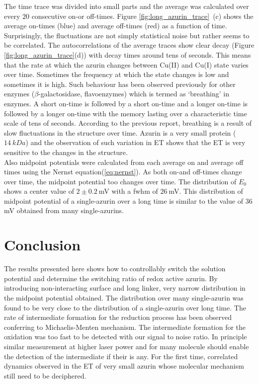 \documentclass[journal=jacsat,manuscript=article]{achemso}
\begin{document}
The time trace was divided into small parts and the average was calculated over every $20$ consecutive on-or off-times. Figure \ref{fig:long_azurin_trace}~(c) shows the average on-times (blue) and average off-times (red) as a function of time. Surprisingly, the fluctuations are not simply statistical noise but rather seems to be correlated. The autocorrelations of the average traces show clear decay (Figure \ref{fig:long_azurin_trace}(d)) with decay times around tens of seconds. This means that the rate at which the azurin changes between Cu(II) and Cu(I) state varies over time. Sometimes the frequency at which the state changes is low and sometimes it is high. Such behaviour has been observed previously for other enzymes ($\beta$-galactosidase, flavoenzymes)\cite{lu1998single-molecule,kou2005single-molecule,english2006ever-fluctuating} which is termed as `breathing' in enzymes. A short on-time is followed by a short on-time and a longer on-time is followed by a longer on-time with the memory lasting over a characteristic time scale of tens of seconds. According to the previous report, breathing is a result of slow fluctuations in the structure over time. Azurin is a very small protein ($14~kDa$) and the observation of such variation in ET shows that the ET is very sensitive to the changes in the structure.\\

Also midpoint potentials were calculated from each average on and average off times using the Nernst equation(\ref{eq:nernst}). As both on-and off-times change over time, the midpoint potential too changes over time. The distribution of $E_0$ shows a center value of $2\pm0.2~$mV with a fwhm of $26~$mV. This distribution of midpoint potential of a single-azurin over a long time is similar to the value of $36~$mV obtained from many single-azurins.
\section{Conclusion}
The results presented here shows how to controllably switch the solution potential and determine the switching ratio of redox active azurin. By introducing non-interacting surface and long linker, very narrow distribution in the midpoint potential obtained. The distribution over many single-azurin was found to be very close to the distribution of a single-azurin over long time. The rate of intermediate formation for the reduction process has been observed conferring to Michaelis-Menten mechanism. The intermediate formation for the oxidation was too fast to be detected with our signal to noise ratio. In principle similar measurement at higher laser power and for many molecule should enable the detection of the intermediate if their is any. For the first time, correlated dynamics observed in the ET of very small azurin whose molecular mechanism still need to be deciphered.
% 
\pagebreak

\end{document}
